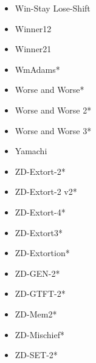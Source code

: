 \begin{appendices}
\begin{multicols}{4}
\begin{itemize}
            \item Win-Stay Lose-Shift
            \item Winner12
            \item Winner21
            \item WmAdams*
            \item Worse and Worse*
            \item Worse and Worse 2*
            \item Worse and Worse 3*
            \item Yamachi
            \item ZD-Extort-2*
            \item ZD-Extort-2 v2*
            \item ZD-Extort-4*
            \item ZD-Extort3*
            \item ZD-Extortion*
            \item ZD-GEN-2*
            \item ZD-GTFT-2*
            \item ZD-Mem2*
            \item ZD-Mischief*
            \item ZD-SET-2*
        \end{itemize}
    \end{multicols}


\end{appendices}
